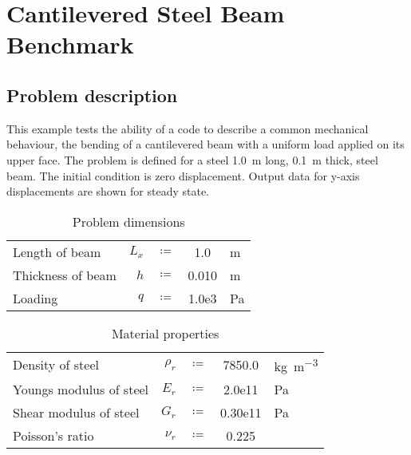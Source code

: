 \section{Cantilevered Steel Beam Benchmark}
\subsection{Problem description}
This example tests the ability of a code to describe a common mechanical behaviour, the bending of a cantilevered beam with a uniform load applied on its upper face. The problem is defined for a steel \SI[scientific-notation=false, round-precision=2]{1.0}{\metre} long, \SI[scientific-notation=false, round-precision=2]{0.1}{\metre} thick, steel beam. The initial condition is zero displacement. Output data for y-axis displacements are shown for steady state.


\begin{table}
	\caption{Problem dimensions}
	\begin{center}
	\begin{tabular}{lrcSs}
		Length of beam & $L_x$ & $\coloneqq$ & 1.0 & \si{\metre} \\
		Thickness of beam& $h$ & $\coloneqq$ & 0.010 & \si{\metre} \\
		Loading& $q$ & $\coloneqq$ & 1.0e3 & \si{\pascal} \\
	\end{tabular}
	\end{center}
	\label{tab:beamDim}
\end{table}
\begin{table}
	\caption{Material properties}
	\begin{center}
	\begin{tabular}{lrcSs}
		Density of steel& $\rho_r$ & $\coloneqq$ & 7850.0 & \si{\kilogram\per\metre\cubed} \\
		Youngs modulus of steel& $E_r$ & $\coloneqq$ & 2.0e11 & \si{\pascal} \\
		Shear modulus of steel& $G_r$ & $\coloneqq$ & 0.30e11 & \si{\pascal} \\
		Poisson's ratio & $\nu_r$ & $\coloneqq$ & 0.225 &  \\
	\end{tabular}
	\end{center}
	\label{tab:beamMatProps}
\end{table}

